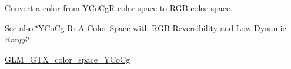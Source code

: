 Convert a color from Y\+Co\+CgR color space to R\+GB color space. \begin{DoxySeeAlso}{See also}
\char`\"{}\+Y\+Co\+Cg-\/\+R\+: A Color Space with R\+G\+B Reversibility and Low Dynamic Range\char`\"{} 

\hyperlink{group__gtx__color__space__YCoCg}{G\+L\+M\+\_\+\+G\+T\+X\+\_\+color\+\_\+space\+\_\+\+Y\+Co\+Cg} 
\end{DoxySeeAlso}
